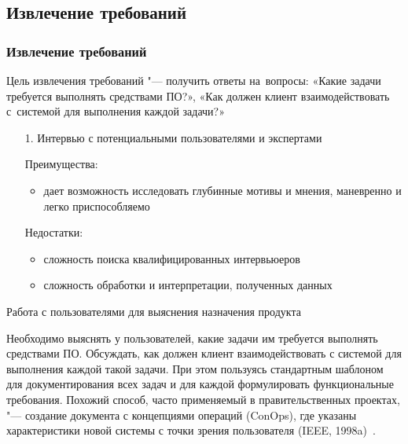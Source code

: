 \documentclass{../industrial-development}
\begin{document}
\subsection{Извлечение требований}
\begin{frame} \frametitle{Извлечение требований}

Цель извлечения требований "--- получить ответы на~вопросы: «Какие задачи требуется выполнять средствами ПО?», «Как должен клиент взаимодействовать с~системой для выполнения каждой задачи?» 
\begin{itemize} 
\item[1.] Интервью с потенциальными пользователями и экспертами

Преимущества: 
\begin{itemize} 
\item дает возможность исследовать глубинные мотивы и мнения, маневренно и легко приспособляемо
\end{itemize}
Недостатки:
\begin{itemize} 
\item сложность поиска квалифицированных интервьюеров
\item сложность обработки и интерпретации, полученных данных
\end{itemize}
\end{itemize}
\end{frame}

\lecturenotes

\alert{Работа с пользователями для выяснения назначения продукта}

Необходимо выяснять у пользователей, какие задачи им требуется выполнять средствами ПО. Обсуждать, как должен клиент взаимодействовать с системой для выполнения каждой такой задачи. При этом пользуясь стандартным шаблоном для документирования всех задач и для каждой формулировать функциональные требования. Похожий способ, часто применяемый в правительственных проектах, "--- создание документа с концепциями операций (ConOps), где указаны характеристики новой системы с точки зрения пользователя (IEEE, 1998a)~\cite[с.~46]{Wiegers}.
\end{document}
